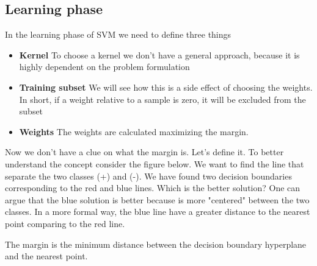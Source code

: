 \documentclass[../main.tex]{subfiles}
\begin{document}
\subsection{Learning phase}
In the learning phase of SVM we need to define three things
\begin{itemize}
    \item \textbf{Kernel} To choose a kernel we don't have a general approach, because it is highly dependent on the problem formulation
    \item \textbf{Training subset} We will see how this is a side effect of choosing the weights. In short, if a weight relative to a sample is zero, it will be excluded from the subset
    \item \textbf{Weights} The weights are calculated maximizing the margin.
\end{itemize}
Now we don't have a clue on what the margin is. Let's define it.
To better understand the concept consider the figure below. We want to find the line that separate the two classes (+) and (-). We have found two decision boundaries corresponding to the red and blue lines. Which is the better solution? One can argue that the blue solution is better because is more "centered" between the two classes. In a more formal way, the blue line have a greater distance to the nearest point comparing to the red line.
\begin{definition}[Margin]
    The margin is the minimum distance between the decision boundary hyperplane and the nearest point.
\end{definition}
\end{document}
